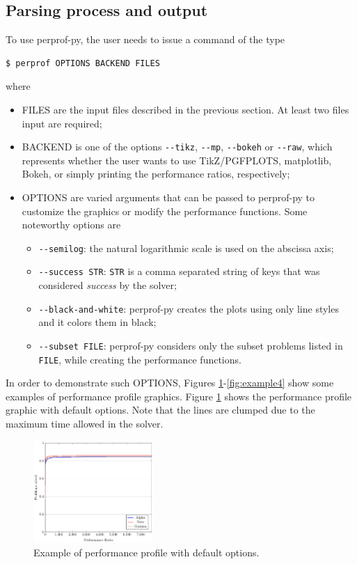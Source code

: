 \subsection*{Parsing process and output}

    To use perprof-py, the user needs to issue a command of the type
\begin{verbatim}
$ perprof OPTIONS BACKEND FILES
\end{verbatim}
    where
    \begin{itemize}
      \item FILES are the input files described in the previous section. At
        least two files input are required;
      \item BACKEND is one of the options \verb+--tikz+, \verb+--mp+,
        \verb+--bokeh+ or
        \verb+--raw+, which represents whether the user wants to use
        TikZ/PGFPLOTS, matplotlib, Bokeh, or simply printing the performance
        ratios, respectively;
      \item OPTIONS are varied arguments that can be passed to perprof-py to
        customize the graphics or modify the performance functions. Some
        noteworthy options are
        \begin{itemize}
          \item \verb+--semilog+: the natural logarithmic scale is used on the
          abscissa axis;
          \item \verb+--success STR+: \verb+STR+ is a comma separated string
            of keys that was considered  \emph{success} by the solver;
          \item \verb+--black-and-white+: perprof-py creates the plots using
            only line styles and it colors them in black;
          \item \verb+--subset FILE+: perprof-py considers only the subset problems listed in \verb+FILE+, while creating the performance functions.
        \end{itemize}
    \end{itemize}
    In order to demonstrate such OPTIONS, Figures
    \ref{fig:example1}-\ref{fig:example4} show some examples of  performance
    profile graphics.
    Figure \ref{fig:example1} shows the performance profile graphic with default
    options. Note that the lines are clumped due to the maximum time allowed
    in the solver.
    \begin{figure}[!ht]
      \centering
      \includegraphics[width=0.4\textwidth]{plots/abc.pdf}
      \caption{Example of performance profile with default options.}
      \label{fig:example1}
    \end{figure}
